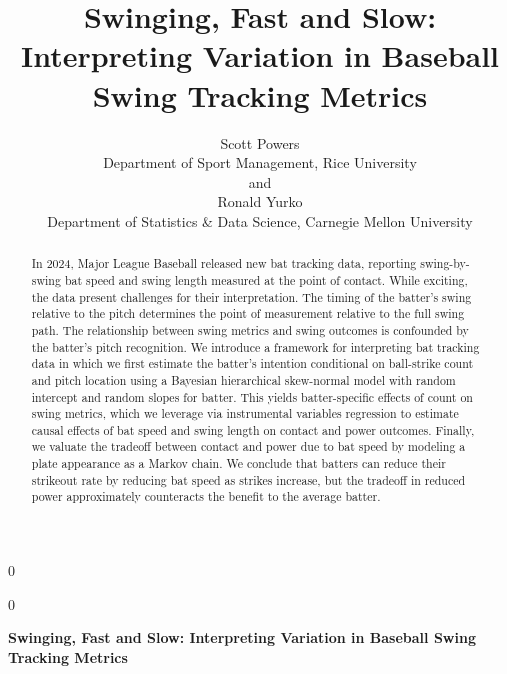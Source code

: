 \documentclass[
  12pt]{article}
\newcommand{\anon}{0}
\begin{document}
\def\spacingset#1{\renewcommand{\baselinestretch}%
{#1}\small\normalsize} \spacingset{1}




\anon
{
  \title{\bf Swinging, Fast and Slow: Interpreting Variation in Baseball Swing Tracking Metrics}
  \author{Scott Powers \\
    Department of Sport Management, Rice University \\
    and \\
    Ronald Yurko \\
    Department of Statistics \& Data Science, Carnegie Mellon University
  }
  \maketitle
} \fi

\anon
{
  \bigskip
  \bigskip
  \bigskip
  \begin{center}
    {\LARGE\bf Swinging, Fast and Slow: Interpreting Variation in Baseball Swing Tracking Metrics}
\end{center}
  \medskip
} \fi

\bigskip
\begin{abstract}
  In 2024, Major League Baseball released new bat tracking data, reporting swing-by-swing bat speed and swing length measured at the point of contact. While exciting, the data present challenges for their interpretation. The timing of the batter's swing relative to the pitch determines the point of measurement relative to the full swing path. The relationship between swing metrics and swing outcomes is confounded by the batter's pitch recognition. We introduce a framework for interpreting bat tracking data in which we first estimate the batter's intention conditional on ball-strike count and pitch location using a Bayesian hierarchical skew-normal model with random intercept and random slopes for batter. This yields batter-specific effects of count on swing metrics, which we leverage via instrumental variables regression to estimate causal effects of bat speed and swing length on contact and power outcomes. Finally, we valuate the tradeoff between contact and power due to bat speed by modeling a plate appearance as a Markov chain. We conclude that batters can reduce their strikeout rate by reducing bat speed as strikes increase, but the tradeoff in reduced power approximately counteracts the benefit to the average batter.
\end{abstract}
\end{document}
